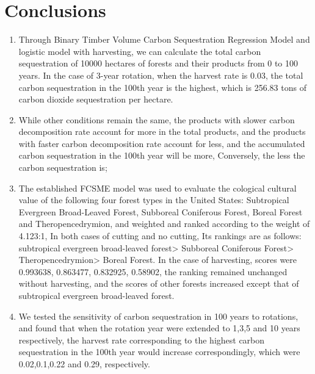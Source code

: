 \documentclass{mcmthesis}
\numberwithin{figure}{section}
\numberwithin{table}{section}
\numberwithin{equation}{section}
\begin{document}
\section{Conclusions}
\begin{enumerate}
  \item Through Binary Timber Volume Carbon Sequestration Regression Model and logistic model with harvesting, we can calculate the total carbon sequestration of 10000 hectares of forests and their products from 0 to 100 years. In the case of 3-year rotation, when the harvest rate is 0.03, the total carbon sequestration in the 100th year is the highest, which is 256.83 tons of carbon dioxide sequestration per hectare.
  \item While other conditions remain the same, the products with slower carbon decomposition rate account for more in the total products, and the products with faster carbon decomposition rate account for less, and the accumulated carbon sequestration in the 100th year will be more, Conversely, the less the carbon sequestration is;
  \item The established FCSME model was used to evaluate the cological cultural value of the following four forest types in the United States: Subtropical Evergreen Broad-Leaved Forest, Subboreal Coniferous Forest, Boreal Forest and Theropencedrymion, and weighted and ranked according to the weight of 4.123:1, In both cases of cutting and no cutting, Its rankings are as follows: subtropical evergreen broad-leaved forest> Subboreal Coniferous Forest> Theropencedrymion> Boreal Forest. In the case of harvesting, scores were 0.993638, 0.863477, 0.832925, 0.58902, the ranking remained unchanged without harvesting, and the scores of other forests increased except that of subtropical evergreen broad-leaved forest.
  \item We tested the sensitivity of carbon sequestration in 100 years to rotations, and found that when the rotation year were extended to 1,3,5 and 10 years respectively, the harvest rate corresponding to the highest carbon sequestration in the 100th year would increase correspondingly, which were 0.02,0.1,0.22 and 0.29, respectively.
\end{enumerate}


\newpage


\memodate{\today}
\end{document}
